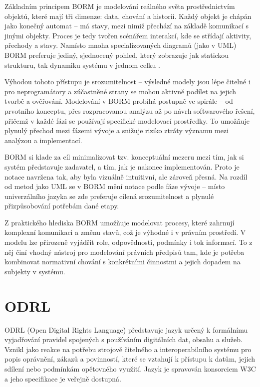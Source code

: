 Základním principem BORM je modelování reálného světa prostřednictvím objektů, které mají tři dimenze: data, chování a historii. Každý objekt je chápán jako konečný automat – má stavy, mezi nimiž přechází na základě komunikací s jinými objekty. Proces je tedy tvořen scénářem interakcí, kde se střídají aktivity, přechody a stavy. Namísto mnoha specializovaných diagramů (jako v UML) BORM preferuje jediný, sjednocený pohled, který zobrazuje jak statickou strukturu, tak dynamiku systému v jednom celku \cite{Knott2006,Pergl2021BORM}.

Výhodou tohoto přístupu je srozumitelnost – výsledné modely jsou lépe čitelné i pro neprogramátory a zúčastněné strany se mohou aktivně podílet na jejich tvorbě a ověřování. Modelování v BORM probíhá postupně ve spirále – od prvotního konceptu, přes rozpracovanou analýzu až po návrh softwarového řešení, přičemž v každé fázi se používají specifické modelovací prostředky. To umožňuje plynulý přechod mezi fázemi vývoje a snižuje riziko ztráty významu mezi analýzou a implementací.

BORM si klade za cíl minimalizovat tzv. konceptuální mezeru mezi tím, jak si systém představuje zadavatel, a tím, jak je nakonec implementován. Proto je notace navržena tak, aby byla vizuálně intuitivní, ale zároveň přesná. Na rozdíl od metod jako UML se v BORM mění notace podle fáze vývoje – místo univerzálního jazyka se zde preferuje cílená srozumitelnost a plynulé přizpůsobování potřebám dané etapy. \cite{Knott2003}

Z praktického hlediska BORM umožňuje modelovat procesy, které zahrnují komplexní komunikaci a změnu stavů, což je výhodné i v právním prostředí. V modelu lze přirozeně vyjádřit role, odpovědnosti, podmínky i tok informací. \cite{Pergl2021BORM} To z něj činí vhodný nástroj pro modelování právních předpisů tam, kde je potřeba kombinovat normativní chování s konkrétními činnostmi a jejich dopadem na subjekty v systému.



\section{ODRL}
\label{sec:odrl}

ODRL (Open Digital Rights Language) představuje jazyk určený k formálnímu vyjadřování pravidel spojených s používáním digitálních dat, obsahu a služeb. Vznikl jako reakce na potřebu strojově čitelného a interoperabilního systému pro popis oprávnění, zákazů a povinností, které se vztahují k přístupu k datům, jejich sdílení nebo podmínkám opětovného využití. Jazyk je spravován konsorciem W3C a jeho specifikace je veřejně dostupná. \cite{W3C_odrl,Bassiliades2015}

